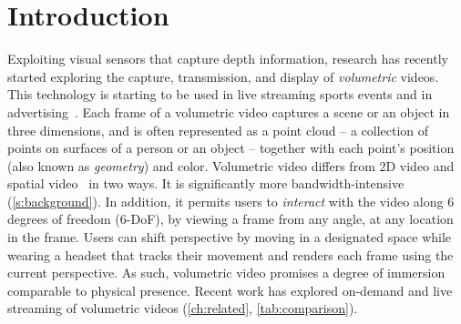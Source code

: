 \section{Introduction}
\label{s:intro_livo}


%
Exploiting visual sensors that capture depth information, research has recently started exploring the capture, transmission, and display of \textit{volumetric} videos.
%
This technology is starting to be used in live streaming sports events and in advertising~\cite{apple_spatial,nba_vol,sxsw_panel}.
%
Each frame of a volumetric video captures a scene or an object in three dimensions, and
is often represented as a point cloud -- a collection of points on surfaces of a person or an object -- together with each point's position (also known as \textit{geometry}) and color.
%
Volumetric video differs from 2D video and spatial video~\cite{apple_spatial} in two ways.
%
It is significantly more bandwidth-intensive (\cref{s:background}).
%
In addition, it permits users to \textit{interact} with the video along 6 degrees of freedom (6-DoF), by viewing a frame from any angle, at any location in the frame.
%
%
Users can shift perspective by moving in a designated space while wearing a headset that tracks their movement and renders each frame using the current perspective.
%
As such, volumetric video promises a degree of immersion comparable to physical presence.
%
Recent work has explored on-demand and live streaming of volumetric videos (\cref{ch:related}, \cref{tab:comparison}). 


